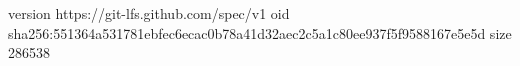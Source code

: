 version https://git-lfs.github.com/spec/v1
oid sha256:551364a531781ebfec6ecac0b78a41d32aec2c5a1c80ee937f5f9588167e5e5d
size 286538

